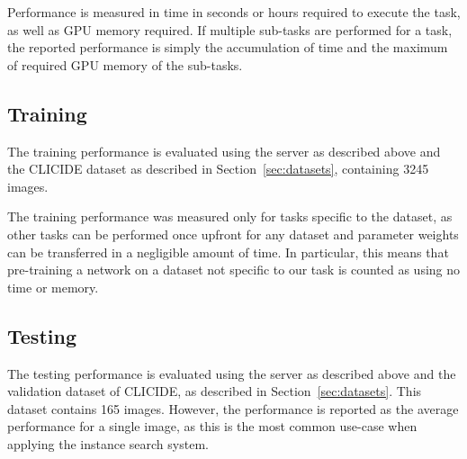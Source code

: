 Performance is measured in time in seconds or hours required to execute the task,
as well as GPU memory required. If multiple sub-tasks are performed for
a task, the reported performance is simply the accumulation of time and
the maximum of required GPU memory of the sub-tasks.
\subsection{Training}
The training performance is evaluated using the server as described above and the
CLICIDE dataset as described in Section~\ref{sec:datasets}, containing 3245 images.

The training performance was measured only for tasks specific to the dataset,
as other tasks can be performed once upfront for any dataset and parameter
weights can be transferred in a negligible amount of time. In particular, this means
that pre-training a network on a dataset not specific to our task is
counted as using no time or memory.

\subsection{Testing}
The testing performance is evaluated using the server as described above and
the validation dataset of CLICIDE, as described in Section~\ref{sec:datasets}.
This dataset contains 165 images. However, the performance is reported
as the average performance for a single image, as this is the most common
use-case when applying the instance search system.
